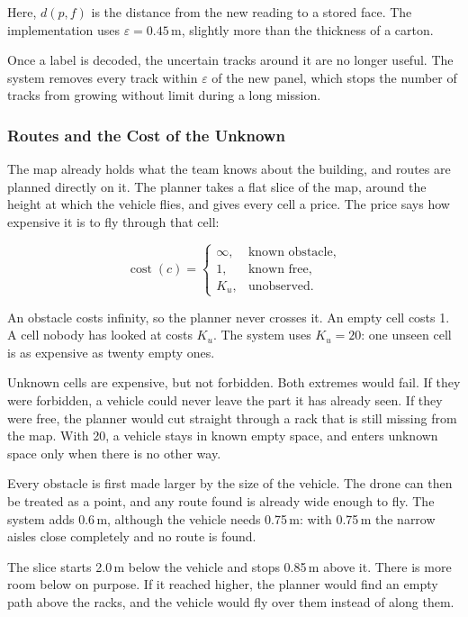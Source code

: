 Here, $d(p,f)$ is the distance from the new reading to a stored face. The
implementation uses $\varepsilon = 0.45$\,m, slightly more than the thickness of
a carton.

Once a label is decoded, the uncertain tracks around it are no longer useful. The
system removes every track within $\varepsilon$ of the new panel, which stops the
number of tracks from growing without limit during a long mission.

\subsubsection*{Routes and the Cost of the Unknown}

The map already holds what the team knows about the building, and routes are
planned directly on it. The planner takes a flat slice of the map, around the
height at which the vehicle flies, and gives every cell a price. The price says
how expensive it is to fly through that cell:

\begin{equation}
    \operatorname{cost}(c)=
    \begin{cases}
        \infty, & \text{known obstacle}, \\[2pt]
        1,      & \text{known free},     \\[2pt]
        K_u,    & \text{unobserved}.
    \end{cases}
    \label{eq:sys:cost}
\end{equation}

An obstacle costs infinity, so the planner never crosses it. An empty cell costs
1. A cell nobody has looked at costs $K_u$. The system uses $K_u = 20$: one
unseen cell is as expensive as twenty empty ones.

Unknown cells are expensive, but not forbidden. Both extremes would fail. If they
were forbidden, a vehicle could never leave the part it has already seen. If they
were free, the planner would cut straight through a rack that is still missing
from the map. With 20, a vehicle stays in known empty space, and enters unknown
space only when there is no other way.

Every obstacle is first made larger by the size of the vehicle. The drone can
then be treated as a point, and any route found is already wide enough to fly.
The system adds 0.6\,m, although the vehicle needs 0.75\,m: with 0.75\,m the
narrow aisles close completely and no route is found.

The slice starts 2.0\,m below the vehicle and stops 0.85\,m above it. There is
more room below on purpose. If it reached higher, the planner would find an empty
path above the racks, and the vehicle would fly over them instead of along them.

